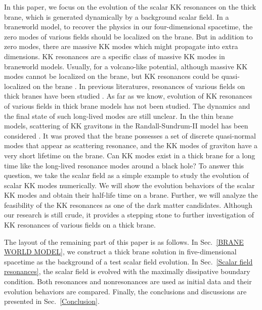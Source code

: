 In this paper, we focus on the evolution of the scalar KK resonances on the thick brane, which is generated dynamically by a background scalar field. In a braneworld model, to recover the physics in our four-dimensional spacetime, the zero modes of various fields should be localized on the brane. But in addition to zero modes, there are massive KK modes which might propagate into extra dimensions. KK resonances are a specific class of massive KK modes in braneworld models. Usually, for a volcano-like potential, although massive KK modes cannot be localized on the brane, but KK resonances could be quasi-localized on the brane \cite{Liu:2009ve}. In previous literatures, resonances of various fields on thick branes have been studied \cite{Liu:2009ve,Almeida:2009jc,Cruz:2013uwa,Xu:2014jda,Csaki:2000pp,Zhang:2016ksq,Sui:2020fty,Tan:2020sys,Chen:2020zzs}. As far as we know, evolution of KK resonances of various fields in thick brane models has not been studied. The dynamics and the final state of such long-lived modes are still unclear. In the thin brane models, scattering of KK gravitons in the Randall-Sundrum-II model has been considered \cite{Seahra:2005wk,Seahra:2005iq}. It was proved that the brane possesses a set of discrete quasi-normal modes that appear as scattering resonance, and the KK modes of graviton have a very short lifetime on the brane. Can KK modes exist in a thick brane for a long time like the long-lived resonance modes around a black hole? To answer this question, we take the scalar field as a simple example to study the evolution of scalar KK modes numerically. We will show the evolution behaviors of the scalar KK modes and obtain their half-life time on a brane. Further, we will analyze the feasibility of the KK resonances as one of the dark matter candidates. Although our research is still crude, it provides a stepping stone to further  investigation of KK resonances of various fields on a thick brane.



The layout of the remaining part of this paper is as follows. In Sec.~\ref{BRANE WORLD MODEL}, we construct a thick brane solution  in five-dimensional spacetime as the background of a test scalar field evolution. In Sec.~\ref{Scalar field resonances}, the scalar field is evolved with the maximally dissipative boundary condition. Both resonances and nonresonances are used as initial data and their evolution behaviors are compared. Finally, the conclusions and discussions are presented in Sec.~\ref{Conclusion}.



